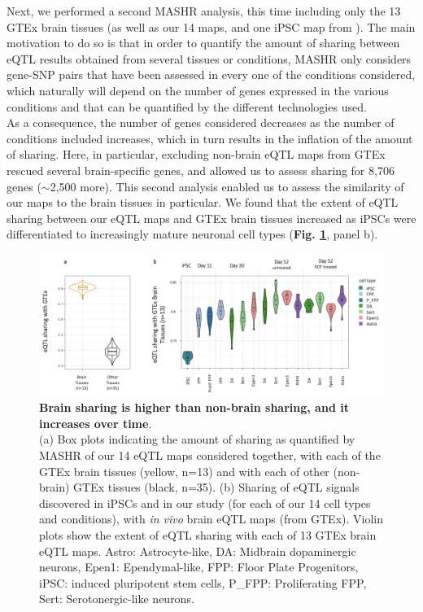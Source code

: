 Next, we performed a second MASHR analysis, this time including only the 13 GTEx brain tissues (as well as our 14 maps, and one iPSC map from \cite{bonder2019systematic}). 
The main motivation to do so is that in order to quantify the amount of sharing between eQTL results obtained from several tissues or conditions, MASHR only considers gene-SNP pairs that have been assessed in every one of the conditions considered, which naturally will depend on the number of genes expressed in the various conditions and that can be quantified by the different technologies used. \\

As a consequence, the number of genes considered decreases as the number of conditions included increases, which in turn results in the inflation of the amount of sharing.
Here, in particular, excluding non-brain eQTL maps from GTEx rescued several brain-specific genes, and allowed us to assess sharing for 8,706 genes ($\sim$2,500 more).
This second analysis enabled us to assess the similarity of our maps to the brain tissues in particular. 
We found that the extent of eQTL sharing between our eQTL maps and GTEx brain tissues increased as iPSCs were differentiated to increasingly mature neuronal cell types (\textbf{Fig. \ref{fig:neuroseq_and_gtex_brain_sharing}}, panel b). 

\begin{figure}[h]
\centering
\includegraphics[width=16cm]{Chapter5/Fig/neuroseq_mashr.png}
\caption[GTEx sharing]{\textbf{Brain sharing is higher than non-brain sharing, and it increases over time}.\\
(a) Box plots indicating the amount of sharing as quantified by MASHR \cite{urbut2019flexible} of our 14 eQTL maps considered together, with each of the GTEx brain tissues (yellow, n=13) and with each of other (non-brain) GTEx tissues (black, n=35).
(b) Sharing of eQTL signals discovered in iPSCs and in our study (for each of our 14 cell types and conditions), with \textit{in vivo} brain eQTL maps (from GTEx). 
Violin plots show the extent of eQTL sharing with each of 13 GTEx brain eQTL maps.
Astro: Astrocyte-like, DA: Midbrain dopaminergic neurons, Epen1: Ependymal-like, FPP: Floor Plate Progenitors, iPSC: induced pluripotent stem cells, P\_FPP: Proliferating FPP, Sert: Serotonergic-like neurons.}
\label{fig:neuroseq_and_gtex_brain_sharing}
\end{figure}

